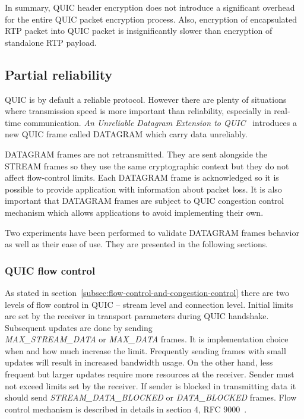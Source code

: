 In summary, QUIC header encryption does not introduce a significant overhead for the entire QUIC packet encryption process.
Also, encryption of encapsulated RTP packet into QUIC packet is insignificantly slower than encryption of standalone RTP payload.

\clearpage

\subsection{Partial reliability}
\label{subsec:partial-reliability}
QUIC is by default a reliable protocol.
However there are plenty of situations where transmission speed is more important than reliability, especially in real-time communication.
\textit{An Unreliable Datagram Extension to QUIC}~\cite{ietf-quic-datagram-02} introduces a new QUIC frame called DATAGRAM which carry data unreliably.

DATAGRAM frames are not retransmitted.
They are sent alongside the STREAM frames so they use the same cryptographic context but they do not affect flow-control limits.
Each DATAGRAM frame is acknowledged so it is possible to provide application with information about packet loss.
It is also important that DATAGRAM frames are subject to QUIC congestion control mechanism which allows applications to avoid implementing their own.

Two experiments have been performed to validate DATAGRAM frames behavior as well as their ease of use.
They are presented in the following sections.

\subsubsection{QUIC flow control}
\label{subsubsec:quic-flow-control}
As stated in section~\ref{subsec:flow-control-and-congestion-control} there are two levels of flow control in QUIC -- stream level and connection level.
Initial limits are set by the receiver in transport parameters during QUIC handshake.
Subsequent updates are done by sending \\ \textit{MAX\_STREAM\_DATA} or \textit{MAX\_DATA} frames.
It is implementation choice when and how much increase the limit.
Frequently sending frames with small updates will result in increased bandwidth usage.
On the other hand, less frequent but larger updates require more resources at the receiver.
Sender must not exceed limits set by the receiver.
If sender is blocked in transmitting data it should send \textit{STREAM\_DATA\_BLOCKED} or \textit{DATA\_BLOCKED} frames.
Flow control mechanism is described in details in section 4, RFC 9000~\cite{rfc9000}.

